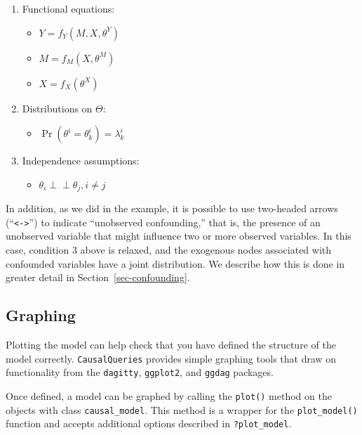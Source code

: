 \documentclass[
  11pt,
  article]{jss}
\providecommand{\tightlist}{%
  \setlength{\itemsep}{0pt}\setlength{\parskip}{0pt}}\usepackage{longtable,booktabs,array}
\begin{document}
\begin{enumerate}
\def\labelenumi{\arabic{enumi}.}
\item
  Functional equations:

  \begin{itemize}
  \tightlist
  \item
    \(Y = f_Y(M, X, \theta^Y)\)
  \item
    \(M = f_M(X, \theta^M)\)
  \item
    \(X = f_X(\theta^X)\)
  \end{itemize}
\item
  Distributions on \(\Theta\):

  \begin{itemize}
  \tightlist
  \item
    \(\Pr(\theta^i = \theta^i_k) = \lambda^i_k\)
  \end{itemize}
\item
  Independence assumptions:

  \begin{itemize}
  \tightlist
  \item
    \(\theta_i \perp\!\!\! \perp \theta_j, i\neq j\)
  \end{itemize}
\end{enumerate}

In addition, as we did in the \citet{chickering_clinicians_1996}
example, it is possible to use two-headed arrows
(``\texttt{\textless{}-\textgreater{}}'') to indicate ``unobserved
confounding,'' that is, the presence of an unobserved variable that
might influence two or more observed variables. In this case, condition
3 above is relaxed, and the exogenous nodes associated with confounded
variables have a joint distribution. We describe how this is done in
greater detail in Section~\ref{sec-confounding}.

\subsection{Graphing}\label{graphing}

Plotting the model can help check that you have defined the structure of
the model correctly. \texttt{CausalQueries} provides simple graphing
tools that draw on functionality from the \texttt{dagitty},
\texttt{ggplot2}, and \texttt{ggdag} packages.

Once defined, a model can be graphed by calling the \texttt{plot()}
method on the objects with class \texttt{causal\_model}. This method is
a wrapper for the \texttt{plot\_model()} function and accepts additional
options described in \texttt{?plot\_model}.
\end{document}
